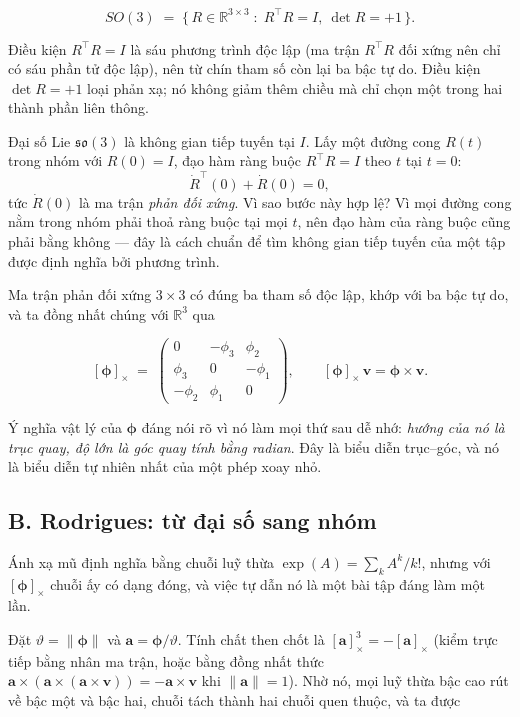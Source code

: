\documentclass[../../vslam.tex]{subfiles}
\begin{document}
\[
SO(3) \;=\; \{\, R \in \mathbb{R}^{3\times 3} \;:\; R^{\top}R = I,\ \det R = +1 \,\}.
\]

Điều kiện \(R^{\top}R = I\) là sáu phương trình độc lập (ma trận \(R^\top R\) đối xứng nên chỉ có sáu phần tử độc lập), nên từ chín tham số còn lại ba bậc tự do. Điều kiện \(\det R = +1\) loại phản xạ; nó không giảm thêm chiều mà chỉ chọn một trong hai thành phần liên thông.

Đại số Lie \(\mathfrak{so}(3)\) là không gian tiếp tuyến tại \(I\). Lấy một đường cong \(R(t)\) trong nhóm với \(R(0) = I\), đạo hàm ràng buộc \(R^{\top}R = I\) theo \(t\) tại \(t=0\):
\[
\dot{R}^{\top}(0) + \dot{R}(0) = 0 ,
\]
tức \(\dot R(0)\) là ma trận \emph{phản đối xứng}. Vì sao bước này hợp lệ? Vì mọi đường cong nằm trong nhóm phải thoả ràng buộc tại mọi \(t\), nên đạo hàm của ràng buộc cũng phải bằng không --- đây là cách chuẩn để tìm không gian tiếp tuyến của một tập được định nghĩa bởi phương trình.

Ma trận phản đối xứng \(3\times 3\) có đúng ba tham số độc lập, khớp với ba bậc tự do, và ta đồng nhất chúng với \(\mathbb{R}^3\) qua

\[
[\boldsymbol{\phi}]_\times \;=\;
\begin{pmatrix} 0 & -\phi_3 & \phi_2 \\ \phi_3 & 0 & -\phi_1 \\ -\phi_2 & \phi_1 & 0 \end{pmatrix},
\qquad
[\boldsymbol{\phi}]_\times\, \mathbf{v} = \boldsymbol{\phi} \times \mathbf{v}.
\]

Ý nghĩa vật lý của \(\boldsymbol{\phi}\) đáng nói rõ vì nó làm mọi thứ sau dễ nhớ: \emph{hướng của nó là trục quay, độ lớn là góc quay tính bằng radian}. Đây là biểu diễn trục--góc, và nó là biểu diễn tự nhiên nhất của một phép xoay nhỏ.

\subsection{B. Rodrigues: từ đại số sang nhóm}

Ánh xạ mũ định nghĩa bằng chuỗi luỹ thừa \(\exp(A) = \sum_k A^k/k!\), nhưng với \([\boldsymbol{\phi}]_\times\) chuỗi ấy có dạng đóng, và việc tự dẫn nó là một bài tập đáng làm một lần.

Đặt \(\vartheta = \|\boldsymbol{\phi}\|\) và \(\mathbf{a} = \boldsymbol{\phi}/\vartheta\). Tính chất then chốt là \([\mathbf{a}]_\times^3 = -[\mathbf{a}]_\times\) (kiểm trực tiếp bằng nhân ma trận, hoặc bằng đồng nhất thức \(\mathbf{a}\times(\mathbf{a}\times(\mathbf{a}\times\mathbf{v})) = -\mathbf{a}\times\mathbf{v}\) khi \(\|\mathbf{a}\|=1\)). Nhờ nó, mọi luỹ thừa bậc cao rút về bậc một và bậc hai, chuỗi tách thành hai chuỗi quen thuộc, và ta được
\end{document}
